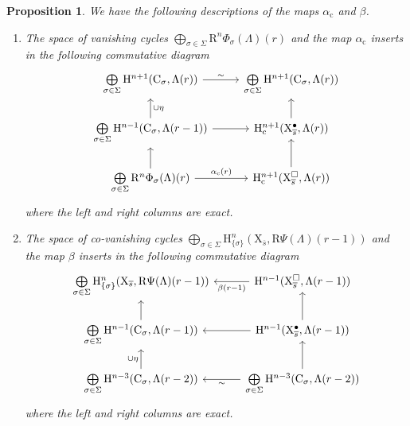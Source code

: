 \documentclass[10pt]{amsart}
\numberwithin{equation}{section}
\newtheorem{proposition}[equation]{Proposition}
\theoremstyle{definition}
\def\rmc{\mathrm{c}}
\def\rmC{\mathrm{C}}
\def\rmH{\mathrm{H}}
\def\rmR{\mathrm{R}}
\def\rmX{\mathrm{X}}
\begin{document}
\begin{proposition}\label{alpha-beta}
We have the following descriptions of the maps $\alpha_{\rmc}$ and $\beta$.
\begin{enumerate}
\item The space of vanishing cycles  $\bigoplus\limits_{\sigma\in\Sigma}\rmR^{n}\Phi_{\sigma}(\Lambda)(r)$ and the map $\alpha_{\rmc}$ inserts in the following commutative diagram 
\begin{equation*}
\begin{tikzcd}
\bigoplus\limits_{\sigma\in\Sigma}\rmH^{n+1}(\rmC_{\sigma}, \Lambda(r)) \arrow[r, "\sim"]                 &       \bigoplus\limits_{\sigma\in\Sigma}\rmH^{n+1}(\rmC_{\sigma}, \Lambda(r))  \\
\bigoplus\limits_{\sigma\in\Sigma}\rmH^{n-1}(\rmC_{\sigma}, \Lambda(r-1)) \arrow[r] \arrow[u, "\cup \eta"'] & \rmH^{n+1}_{\rmc}({\rmX}^{\bullet}_{\overline{s}}, \Lambda(r)) \arrow[u] \\
\bigoplus\limits_{\sigma\in\Sigma}\rmR^{n}\Phi_{\sigma}(\Lambda)(r) \arrow[r, "\alpha_{\rmc}(r)"] \arrow[u]       & \rmH^{n+1}_{\rmc}(\rmX^{\square}_{\overline{s}}, \Lambda(r)) \arrow[u]
\end{tikzcd}
\end{equation*}
where the left and right columns are exact.
\item The space of co-vanishing cycles   $\bigoplus\limits_{\sigma\in\Sigma}\rmH^{n}_{\{\sigma\}}(\rmX_{\overline{s}}, \rmR\Psi(\Lambda)(r-1))$ and the map $\beta$ inserts in the following commutative diagram 
\begin{equation*}
\begin{tikzcd}
\bigoplus\limits_{\sigma\in\Sigma}\rmH^{n}_{\{\sigma\}}(\rmX_{\overline{s}}, \rmR\Psi(\Lambda)(r-1))              &\mathrm{H}^{n-1}(\rmX^{\square}_{\overline{s}}, \Lambda(r-1))\arrow[l, "\beta(r-1)"]           \\
\bigoplus\limits_{\sigma\in\Sigma}\rmH^{n-1}(\rmC_{\sigma}, \Lambda(r-1)) \arrow[u] &   \mathrm{H}^{n-1}({\rmX}^{\bullet}_{\overline{s}}, \Lambda(r-1)) \arrow[l] \arrow[u] \\
\bigoplus\limits_{\sigma\in\Sigma}\rmH^{n-3}(\rmC_{\sigma}, \Lambda(r-2)) \arrow[u, "\cup\eta"]       &  \bigoplus\limits_{\sigma\in\Sigma}\rmH^{n-3}(\rmC_{\sigma}, \Lambda(r-2))\arrow[l,"\sim"] \arrow[u]
\end{tikzcd}
\end{equation*}
where the left and right columns are exact.
\end{enumerate}
\end{proposition}
\end{document}

